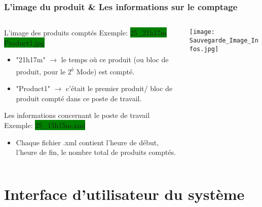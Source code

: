 \documentclass{beamer}
\begin{document}
\begin{frame}
\frametitle{L'image du produit \& Les informations sur le comptage}

\begin{columns}
\begin{column}{0.70\textwidth}

\begin{exampleblock}{L'image des produits comptés}
	Exemple: \colorbox{green}{25\_21h\textendash 17m Product1.jpg} 
\end{exampleblock}

\begin{itemize}
\item "21h\textendash 17m" $\longrightarrow$ le temps où ce produit (ou bloc de produit, pour le 2\textsuperscript{è} Mode) est compté.
\item "Product1" $\longrightarrow$ c'était le premier produit/ bloc de produit compté dans ce poste de travail.
\end{itemize}

\begin{exampleblock}{Les informations concernant le poste de travail}
	Exemple: \colorbox{green}{25\_15h\textendash 15m.xml}
\end{exampleblock}

\begin{itemize}
\item Chaque fichier .xml contient l'heure de début, l'heure de fin, le nombre total de produits comptés.
\end{itemize}

\end{column}

\begin{column}{0.3\textwidth}
\centering
    \texttt{[image: Sauvegarde\_Image\_Infos.jpg]}
\end{column}

\end{columns}

\end{frame}

\section{Interface d'utilisateur du système}
\end{document}
